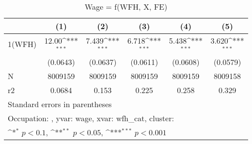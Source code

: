 \begin{table}[htbp]\centering
\def\sym#1{\ifmmode^{#1}\else\(^{#1}\)\fi}
\caption{Wage = f(WFH, X, FE)}
\begin{tabular}{l*{5}{c}}
\hline\hline
                    &\multicolumn{1}{c}{(1)}         &\multicolumn{1}{c}{(2)}         &\multicolumn{1}{c}{(3)}         &\multicolumn{1}{c}{(4)}         &\multicolumn{1}{c}{(5)}         \\
\hline
1(WFH)              &       12.00\sym{***}&       7.439\sym{***}&       6.718\sym{***}&       5.438\sym{***}&       3.620\sym{***}\\
                    &    (0.0643)         &    (0.0637)         &    (0.0611)         &    (0.0608)         &    (0.0579)         \\
\hline
N                   &     8009159         &     8009159         &     8009159         &     8009159         &     8009158         \\
r2                  &      0.0684         &       0.153         &       0.225         &       0.258         &       0.329         \\
\hline\hline
\multicolumn{6}{l}{\footnotesize Standard errors in parentheses}\\
\multicolumn{6}{l}{\footnotesize Occupation: , yvar: wage, xvar: wfh\_cat, cluster: }\\
\multicolumn{6}{l}{\footnotesize \sym{*} \(p<0.1\), \sym{**} \(p<0.05\), \sym{***} \(p<0.001\)}\\
\end{tabular}
\end{table}
